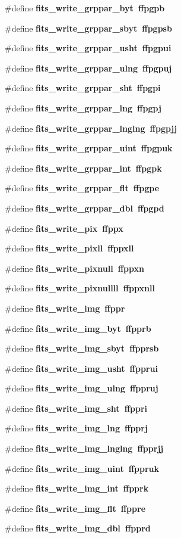 \begin{CompactItemize}
\#define \bf{fits\_\-write\_\-grppar\_\-byt}~ffpgpb
\item 
\#define \bf{fits\_\-write\_\-grppar\_\-sbyt}~ffpgpsb
\item 
\#define \bf{fits\_\-write\_\-grppar\_\-usht}~ffpgpui
\item 
\#define \bf{fits\_\-write\_\-grppar\_\-ulng}~ffpgpuj
\item 
\#define \bf{fits\_\-write\_\-grppar\_\-sht}~ffpgpi
\item 
\#define \bf{fits\_\-write\_\-grppar\_\-lng}~ffpgpj
\item 
\#define \bf{fits\_\-write\_\-grppar\_\-lnglng}~ffpgpjj
\item 
\#define \bf{fits\_\-write\_\-grppar\_\-uint}~ffpgpuk
\item 
\#define \bf{fits\_\-write\_\-grppar\_\-int}~ffpgpk
\item 
\#define \bf{fits\_\-write\_\-grppar\_\-flt}~ffpgpe
\item 
\#define \bf{fits\_\-write\_\-grppar\_\-dbl}~ffpgpd
\item 
\#define \bf{fits\_\-write\_\-pix}~ffppx
\item 
\#define \bf{fits\_\-write\_\-pixll}~ffppxll
\item 
\#define \bf{fits\_\-write\_\-pixnull}~ffppxn
\item 
\#define \bf{fits\_\-write\_\-pixnullll}~ffppxnll
\item 
\#define \bf{fits\_\-write\_\-img}~ffppr
\item 
\#define \bf{fits\_\-write\_\-img\_\-byt}~ffpprb
\item 
\#define \bf{fits\_\-write\_\-img\_\-sbyt}~ffpprsb
\item 
\#define \bf{fits\_\-write\_\-img\_\-usht}~ffpprui
\item 
\#define \bf{fits\_\-write\_\-img\_\-ulng}~ffppruj
\item 
\#define \bf{fits\_\-write\_\-img\_\-sht}~ffppri
\item 
\#define \bf{fits\_\-write\_\-img\_\-lng}~ffpprj
\item 
\#define \bf{fits\_\-write\_\-img\_\-lnglng}~ffpprjj
\item 
\#define \bf{fits\_\-write\_\-img\_\-uint}~ffppruk
\item 
\#define \bf{fits\_\-write\_\-img\_\-int}~ffpprk
\item 
\#define \bf{fits\_\-write\_\-img\_\-flt}~ffppre
\item 
\#define \bf{fits\_\-write\_\-img\_\-dbl}~ffpprd
\item 

\end{CompactItemize}
